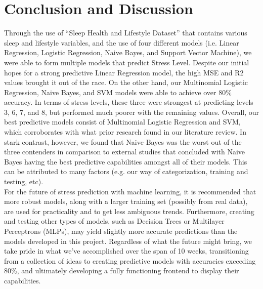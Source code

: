 \documentclass[11pt, letterpaper]{article}
\begin{document}
    \section*{Conclusion and Discussion}
    \noindent Through the use of “Sleep Health and Lifestyle Dataset” that contains various sleep and lifestyle variables, and the use of four different models (i.e. Linear Regression, Logistic Regression, Naive Bayes, and Support Vector Machine), we were able to form multiple models that predict Stress Level. Despite our initial hopes for a strong predictive Linear Regression model, the high MSE and R2 values brought it out of the race. On the other hand, our Multinomial Logistic Regression, Naive Bayes, and SVM models were able to achieve over 80\% accuracy. In terms of stress levels, these three were strongest at predicting levels 3, 6, 7, and 8, but performed much poorer with the remaining values. Overall, our best predictive models consist of Multinomial Logistic Regression and SVM, which corroborates with what prior research found in our literature review. In stark contrast, however, we found that Naive Bayes was the worst out of the three contenders in comparison to external studies that concluded with Naive Bayes having the best predictive capabilities amongst all of their models. This can be attributed to many factors (e.g. our way of categorization, training and testing, etc).\\
    
    \noindent For the future of stress prediction with machine learning, it is recommended that more robust models, along with a larger training set (possibly from real data), are used for practicality and to get less ambiguous trends. Furthermore, creating and testing other types of models, such as Decision Trees or Multilayer Perceptrons (MLPs), may yield slightly more accurate predictions than the models developed in this project. Regardless of what the future might bring, we take pride in what we’ve accomplished over the span of 10 weeks, transitioning from a collection of ideas to creating predictive models with accuracies exceeding 80\%, and ultimately developing a fully functioning frontend to display their capabilities.

    \newpage
\end{document}
